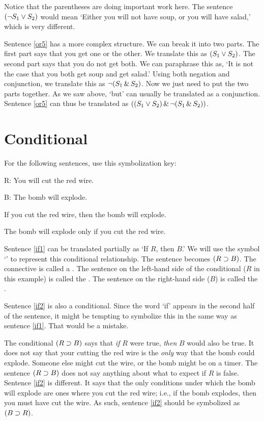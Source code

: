 Notice that the parentheses are doing important work here. The sentence $(\neg S_1 \vee S_2)$ would mean `Either you will not have soup, or you will have salad,' which is very different.

Sentence \ref{or5} has a more complex structure. We can break it into two parts. The first part says that you get one or the other. We translate this as $(S_1 \vee S_2)$. The second part says that you do not get both. We can paraphrase this as, `It is not the case that you both get soup and get salad.' Using both negation and conjunction, we translate this as $\neg(S_1 \,\&\, S_2)$. Now we just need to put the two parts together. As we saw above, `but' can usually be translated as a conjunction. Sentence \ref{or5} can thus be translated as $((S_1 \vee S_2) \,\&\, \neg(S_1 \,\&\, S_2))$.

\section{Conditional}
For the following sentences, use this symbolization key:

\begin{ekey}
\item[R:] You will cut the red wire.
\item[B:] The bomb will explode.
\end{ekey}

\begin{earg}
\item[\ex{if1}] If you cut the red wire, then the bomb will explode.
\item[\ex{if2}] The bomb will explode only if you cut the red wire.
\end{earg}

Sentence \ref{if1} can be translated partially as `If $R$, then $B$.' We will use the symbol `\eif' to represent this conditional relationship. The sentence becomes $(R\supset B)$. The connective is called a . The sentence on the left-hand side of the conditional ($R$ in this example) is called the . The sentence on the right-hand side ($B$) is called the .

Sentence \ref{if2} is also a conditional. Since the word `if' appears in the second half of the sentence, it might be tempting to symbolize this in the same way as sentence \ref{if1}. That would be a mistake.

The conditional $(R\supset B)$ says that \emph{if} $R$ were true, \emph{then} $B$ would also be true. It does not say that your cutting the red wire is the \emph{only} way that the bomb could explode. Someone else might cut the wire, or the bomb might be on a timer. The sentence $(R\supset B)$ does not say anything about what to expect if $R$ is false. Sentence \ref{if2} is different. It says that the only conditions under which the bomb will explode are ones where you cut the red wire; i.e., if the bomb explodes, then you must have cut the wire. As such, sentence \ref{if2} should be symbolized as $(B \supset R)$.

